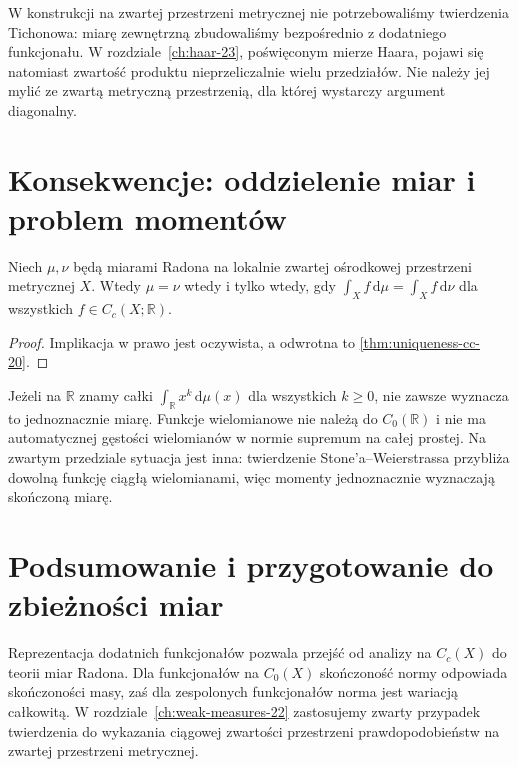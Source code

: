 \begin{uwaga}
W konstrukcji na zwartej przestrzeni metrycznej nie
potrzebowaliśmy twierdzenia Tichonowa: miarę zewnętrzną
zbudowaliśmy bezpośrednio z dodatniego funkcjonału.
W rozdziale~\ref{ch:haar-23}, poświęconym mierze Haara,
pojawi się natomiast zwartość produktu nieprzeliczalnie
wielu przedziałów.
Nie należy jej mylić ze zwartą metryczną przestrzenią,
dla której wystarczy argument diagonalny.
\end{uwaga}

\section{Konsekwencje: oddzielenie miar i problem momentów}
\begin{wniosek}
\label{cor:measures-separate-21}
Niech $\mu,\nu$ będą miarami Radona na lokalnie zwartej
ośrodkowej przestrzeni metrycznej $X$. Wtedy
$\mu=\nu$ wtedy i tylko wtedy, gdy
$\int_Xf\,\mathrm d\mu=\int_Xf\,\mathrm d\nu$
dla wszystkich $f\in C_c(X;\mathbb R)$.
\end{wniosek}
\begin{proof}
Implikacja w prawo jest oczywista, a odwrotna to
\ref{thm:uniqueness-cc-20}.
\end{proof}

\begin{uwaga}
Jeżeli na $\mathbb R$ znamy całki
$\int_{\mathbb R}x^k\,\mathrm d\mu(x)$ dla wszystkich
$k\ge0$, nie zawsze wyznacza to jednoznacznie miarę.
Funkcje wielomianowe nie należą do $C_0(\mathbb R)$
i nie ma automatycznej gęstości wielomianów w normie
supremum na całej prostej. Na zwartym przedziale
sytuacja jest inna: twierdzenie Stone'a--Weierstrassa
przybliża dowolną funkcję ciągłą wielomianami,
więc momenty jednoznacznie wyznaczają skończoną miarę.
\end{uwaga}

\section{Podsumowanie i przygotowanie do zbieżności miar}
Reprezentacja dodatnich funkcjonałów pozwala przejść
od analizy na $C_c(X)$ do teorii miar Radona. Dla
funkcjonałów na $C_0(X)$ skończoność normy odpowiada
skończoności masy, zaś dla zespolonych funkcjonałów
norma jest wariacją całkowitą. W rozdziale~\ref{ch:weak-measures-22}
zastosujemy zwarty przypadek twierdzenia do wykazania
ciągowej zwartości przestrzeni prawdopodobieństw na
zwartej przestrzeni metrycznej.
